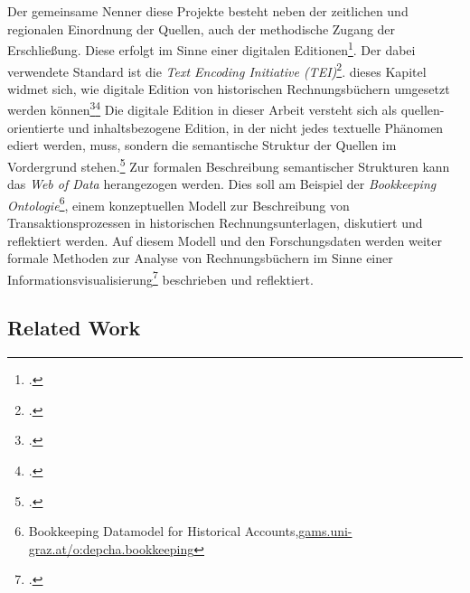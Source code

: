 \documentclass[12pt,a4paper]{article}
\begin{document}
\\
\\
Der gemeinsame Nenner diese Projekte besteht neben der zeitlichen und regionalen Einordnung der Quellen, auch der methodische Zugang der Erschließung. Diese erfolgt im Sinne einer digitalen Editionen\footcite{sahle2013digitale}. Der dabei verwendete Standard ist die \textit{Text Encoding Initiative (TEI)}\footcite{cummings2013text}. dieses Kapitel widmet sich, wie digitale Edition von historischen Rechnungsbüchern umgesetzt werden können\footcite{tomasek2013encoding}\footcite{vogeler2016content} Die digitale Edition in dieser Arbeit versteht sich als quellen-orientierte und inhaltsbezogene Edition, in der nicht jedes textuelle Phänomen ediert werden, muss, sondern die semantische Struktur der Quellen im Vordergrund stehen.\footcite{vogeler2019assertive} Zur formalen Beschreibung semantischer Strukturen kann das \textit{Web of Data} herangezogen werden. Dies soll am Beispiel der \textit{Bookkeeping Ontologie}\footnote{Bookkeeping Datamodel for Historical Accounts,\url{gams.uni-graz.at/o:depcha.bookkeeping}}, einem konzeptuellen Modell zur Beschreibung von Transaktionsprozessen in historischen Rechnungsunterlagen, diskutiert und reflektiert werden. Auf diesem Modell und den Forschungsdaten werden weiter formale Methoden zur Analyse von Rechnungsbüchern im Sinne einer Informationsvisualisierung\footcite{frank2018visualisierungswerkzeuge} beschrieben und reflektiert.

\subsection{Related Work}
\end{document}

